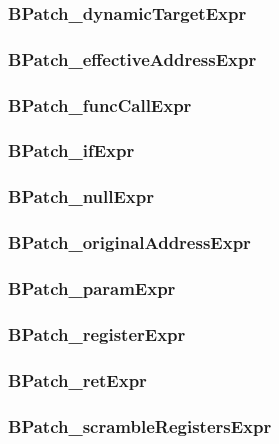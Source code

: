 \subsubsection{BPatch\_dynamicTargetExpr}


\subsubsection{BPatch\_effectiveAddressExpr}


\subsubsection{BPatch\_funcCallExpr}


\subsubsection{BPatch\_ifExpr}


\subsubsection{BPatch\_nullExpr}


\subsubsection{BPatch\_originalAddressExpr}


\subsubsection{BPatch\_paramExpr}


\subsubsection{BPatch\_registerExpr}


\subsubsection{BPatch\_retExpr}


\subsubsection{BPatch\_scrambleRegistersExpr}


